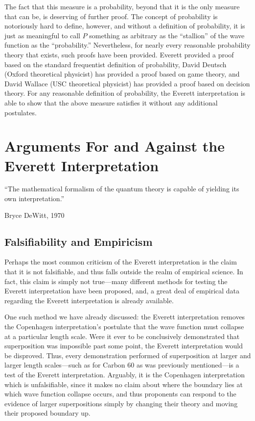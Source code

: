 \documentclass[
    12pt,
    letterpaper,
    aps,
    prd,
    longbibliography,
    twocolumn,
    nofootinbib,
    raggedbottom,
    amsmath,
    amssymb,
    amsfonts,
]{revtex4-1}
\begin{document}
The fact that this measure is a probability, beyond that it is the only measure that can be, is deserving of further proof. The concept of probability is notoriously hard to define, however, and without a definition of probability, it is just as meaningful to call $P$ something as arbitrary as the ``stallion'' of the wave function as the ``probability.'' Nevertheless, for nearly every reasonable probability theory that exists, such proofs have been provided. Everett provided a proof based on the standard frequentist definition of probability\cite{everett}\cite{relativestate}, David Deutsch (Oxford theoretical physicist) has provided a proof based on game theory\cite{bornproof1}, and David Wallace (USC theoretical physicist) has provided a proof based on decision theory\cite{bornproof2}. For any reasonable definition of probability, the Everett interpretation is able to show that the above measure satisfies it without any additional postulates.\cite{bornproof3}\cite{bornproof2summary}\cite{chris}

\section{Arguments For and Against the Everett Interpretation}
\label{sec:args}

\epigraph{``The mathematical formalism of the quantum theory is capable of yielding its own interpretation.''\cite{dewitt}}{Bryce DeWitt, 1970}

\subsection{Falsifiability and Empiricism}

Perhaps the most common criticism of the Everett interpretation is the claim that it is not falsifiable, and thus falls outside the realm of empirical science.\cite{carolltestable} In fact, this claim is simply not true---many different methods for testing the Everett interpretation have been proposed, and, a great deal of empirical data regarding the Everett interpretation is already available.

One such method we have already discussed: the Everett interpretation removes the Copenhagen interpretation's postulate that the wave function must collapse at a particular length scale. Were it ever to be conclusively demonstrated that superposition was impossible past some point, the Everett interpretation would be disproved. Thus, every demonstration performed of superposition at larger and larger length scales---such as for Carbon 60 as was previously mentioned\cite{buckyballs}---is a test of the Everett interpretation. Arguably, it is the Copenhagen interpretation which is unfalsifiable, since it makes no claim about where the boundary lies at which wave function collapse occurs, and thus proponents can respond to the evidence of larger superpositions simply by changing their theory and moving their proposed boundary up.
\end{document}

